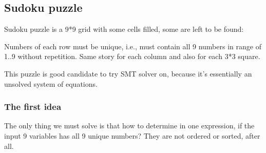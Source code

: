 \subsection{Sudoku puzzle}

Sudoku puzzle is a 9*9 grid with some cells filled, some are left to be found:


\newcommand\setrow[9]{
  \setcounter{col}{1}
  \foreach \n in {#1, #2, #3, #4, #5, #6, #7, #8, #9} {
    \edef\x{\value{col} - 0.5}
    \edef\y{9.5 - \value{row}}
    \node[anchor=center] at (\x, \y) {\n};
    \stepcounter{col}
  }
  \stepcounter{row}
}

\begin{center}
\end{center}

Numbers of each row must be unique, i.e., must contain all 9 numbers in range of 1..9 without repetition.
Same story for each column and also for each 3*3 square.

This puzzle is good candidate to try \ac{SMT} solver on, because it's essentially an unsolved system of equations.

\subsubsection{The first idea}

The only thing we must solve is that how to determine in one expression, if the input 9 variables has all 9 unique numbers?
They are not ordered or sorted, after all.

